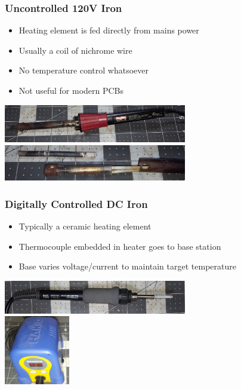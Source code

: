 \documentclass{beamer}
\begin{document}
\begin{frame}
\frametitle{Uncontrolled 120V Iron}
\begin{itemize}
\item Heating element is fed directly from mains power
\item Usually a coil of nichrome wire
\item No temperature control whatsoever
\item Not useful for modern PCBs
\end{itemize}
\begin{center}
\includegraphics[width=8cm,keepaspectratio]{uncontrolled-iron.jpg} \\
\includegraphics[width=8cm,keepaspectratio]{nichrome-heater.jpg}
\end{center}
\end{frame}

\begin{frame}
\frametitle{Digitally Controlled DC Iron}
\begin{itemize}
\item Typically a ceramic heating element
\item Thermocouple embedded in heater goes to base station
\item Base varies voltage/current to maintain target temperature
\end{itemize}
\begin{center}
\includegraphics[width=8cm,keepaspectratio]{ceramic-heater.jpg} \\
\includegraphics[height=3cm,keepaspectratio]{base-station.jpg}
\end{center}
\end{frame}
\end{document}

